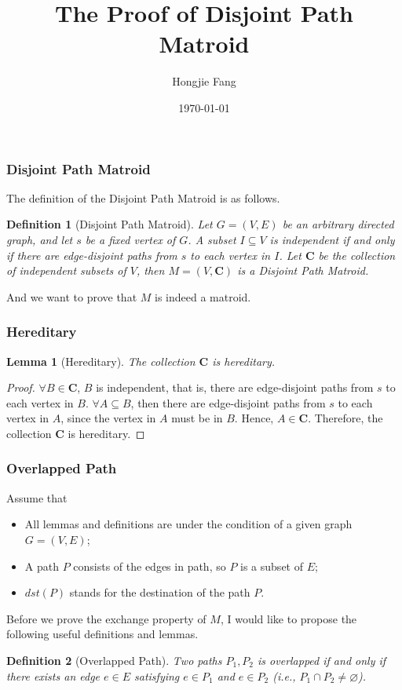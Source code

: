 \documentclass[notheorems]{beamer}
\newtheorem{lemma}[theorem]{Lemma}
\newtheorem{definition}{Definition}
\begin{document}
\title[The Proof of Disjoint Path Matroid]{The Proof of Disjoint Path Matroid}
\author[Hongjie Fang]{Hongjie Fang}
\date[\today]{\today}
\frame{\titlepage}

\begin{frame}
\frametitle{Disjoint Path Matroid}
The definition of the Disjoint Path Matroid is as follows.
\begin{definition}[Disjoint Path Matroid]
Let $G = (V,E)$ be an arbitrary directed graph, and let $s$ be a fixed vertex of $G$. A subset $I \subseteq V$ is independent if and only if there are edge-disjoint paths from $s$ to each vertex in $I$. Let $\mathbf{C}$ be the collection of independent subsets of $V$, then $M = (V, \mathbf{C})$ is a Disjoint Path Matroid.
\end{definition}
And we want to prove that $M$ is indeed a matroid.
\end{frame}

\begin{frame}
\frametitle{Hereditary}
\begin{lemma}[Hereditary]
The collection $\mathbf{C}$ is hereditary.
\end{lemma}
\begin{proof}
$\forall B \in \mathbf{C}$, $B$ is independent, that is, there are edge-disjoint paths from $s$ to each vertex in $B$. $\forall A \subseteq B$, then there are edge-disjoint paths from $s$ to each vertex in $A$, since the vertex in $A$ must be in $B$. Hence, $A \in \mathbf{C}$.
Therefore, the collection $\mathbf{C}$ is hereditary.
\end{proof}
\end{frame}

\begin{frame}
\frametitle{Overlapped Path}
Assume that
\begin{itemize}
  \item All lemmas and definitions are under the condition of a given graph $G=(V,E)$;
  \item A path $P$ consists of the edges in path, so $P$ is a subset of $E$;
  \item $dst(P)$ stands for the destination of the path $P$.
\end{itemize}
Before we prove the exchange property of $M$, I would like to propose the following useful definitions and lemmas.
\begin{definition}[Overlapped Path]
Two paths $P_1, P_2$ is overlapped if and only if there exists an edge $e \in E$ satisfying $e \in P_1$ and $e \in P_2$ (i.e., $P_1 \cap P_2 \ne \varnothing$).
\end{definition}
\end{frame}
\end{document}
